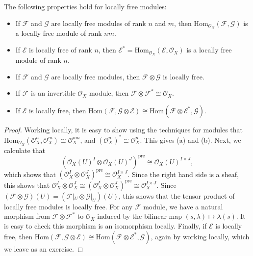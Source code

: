 \begin{theorem}
    The following properties hold for locally free modules:
    \begin{itemize}
        \item If $\mathcal{F}$ and $\mathcal{G}$ are locally free modules of rank $n$ and $m$, then $\text{Hom}_{\mathcal{O}_X}(\mathcal{F},\mathcal{G})$ is a locally free module of rank $nm$.

        \item If $\mathcal{E}$ is locally free of rank $n$, then $\mathcal{E}^* = \text{Hom}_{\mathcal{O}_X}(\mathcal{E},\mathcal{O}_X)$ is a locally free module of rank $n$.

        \item If $\mathcal{F}$ and $\mathcal{G}$ are locally free modules, then $\mathcal{F} \otimes \mathcal{G}$ is locally free.

        \item If $\mathcal{F}$ is an invertible $\mathcal{O}_X$ module, then $\mathcal{F} \otimes \mathcal{F}^* \cong \mathcal{O}_X$.

        \item If $\mathcal{E}$ is locally free, then $\text{Hom}(\mathcal{F},\mathcal{G} \otimes \mathcal{E}) \cong \text{Hom}(\mathcal{F} \otimes \mathcal{E}^*, \mathcal{G})$.
    \end{itemize}
\end{theorem}
\begin{proof}
    Working locally, it is easy to show using the techniques for modules that $\text{Hom}_{\mathcal{O}_X}(\mathcal{O}_X^n, \mathcal{O}_X^m) \cong \mathcal{O}_X^{nm}$, and $(\mathcal{O}_X^n)^* \cong \mathcal{O}_X^n$. This gives (a) and (b). Next, we calculate that
    \[ (\mathcal{O}_X(U)^I \otimes \mathcal{O}_X(U)^J)^{\text{pre}} \cong \mathcal{O}_X(U)^{I \times J}, \]
    which shows that $(\mathcal{O}_X^I \otimes \mathcal{O}_X^J)^{\text{pre}} \cong \mathcal{O}_X^{I \times J}$. Since the right hand side is a sheaf, this shows that $\mathcal{O}_X^I \otimes \mathcal{O}_X^J \cong (\mathcal{O}_X^I \otimes \mathcal{O}_X^J)^{\text{pre}} \cong \mathcal{O}_X^{I \times J}$. Since $(\mathcal{F} \otimes \mathcal{G})(U) = (\mathcal{F}|_U \otimes \mathcal{G}|_U)(U)$, this shows that the tensor product of locally free modules is locally free. For any $\mathcal{F}$ module, we have a natural morphism from $\mathcal{F} \otimes \mathcal{F}^*$ to $\mathcal{O}_X$ induced by the bilinear map $(s, \lambda) \mapsto \lambda(s)$. It is easy to check this morphism is an isomorphism locally. Finally, if $\mathcal{E}$ is locally free, then $\text{Hom}(\mathcal{F}, \mathcal{G} \otimes \mathcal{E}) \cong \text{Hom}(\mathcal{F} \otimes \mathcal{E}^*, \mathcal{G})$, again by working locally, which we leave as an exercise.
\end{proof}

